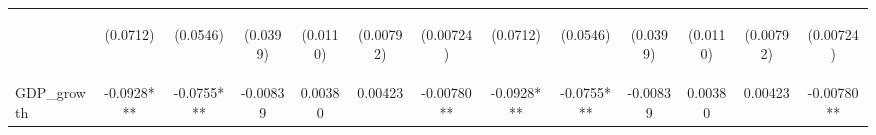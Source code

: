 \documentclass[]{article}
\begin{document}
\begin{center}
\begin{tabular}{lcccccccccccc}
\vspace{4pt} & \begin{footnotesize}(0.0712)\end{footnotesize} & \begin{footnotesize}(0.0546)\end{footnotesize} & \begin{footnotesize}(0.0399)\end{footnotesize} & \begin{footnotesize}(0.0110)\end{footnotesize} & \begin{footnotesize}(0.00792)\end{footnotesize} & \begin{footnotesize}(0.00724)\end{footnotesize} & \begin{footnotesize}(0.0712)\end{footnotesize} & \begin{footnotesize}(0.0546)\end{footnotesize} & \begin{footnotesize}(0.0399)\end{footnotesize} & \begin{footnotesize}(0.0110)\end{footnotesize} & \begin{footnotesize}(0.00792)\end{footnotesize} & \begin{footnotesize}(0.00724)\end{footnotesize} \\
GDP\_growth & -0.0928*** & -0.0755*** & -0.00839 & 0.00380 & 0.00423 & -0.00780** & -0.0928*** & -0.0755*** & -0.00839 & 0.00380 & 0.00423 & -0.00780** \\

\end{tabular}
\end{center}
\end{document}
